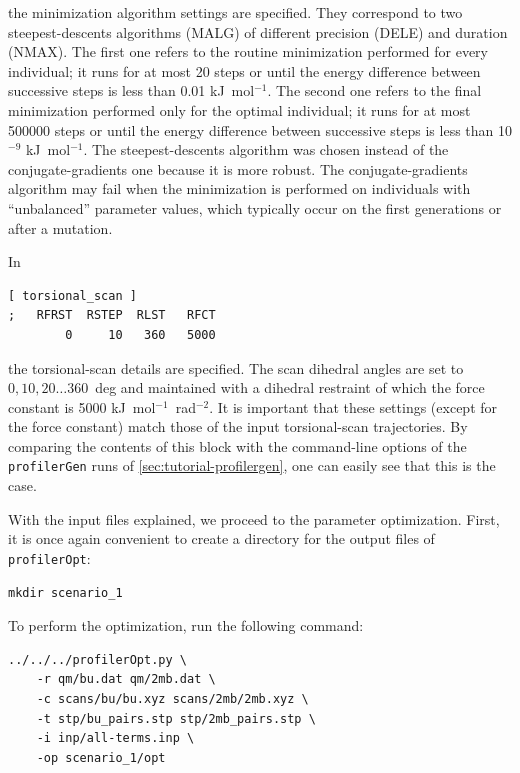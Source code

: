 \documentclass[10pt,a4paper,openany]{memoir}
\numberwithin{equation}{section}
\newcommand{\profileropt}[0]{\texttt{profilerOpt}}
\newcommand{\profilergen}[0]{\texttt{profilerGen}}
\begin{document}
\noindent the minimization algorithm settings are specified.
%
They correspond to two steepest-descents algorithms (MALG) of
different precision (DELE) and duration (NMAX).
%
The first one refers to the routine minimization performed for every
individual; it runs for at most 20 steps or until the energy
difference between successive steps is less than 0.01 kJ~mol$^{-1}$.
%
The second one refers to the final minimization performed only for the
optimal individual; it runs for at most 500000 steps or until the energy
difference between successive steps is less than 10$^{-9}$
kJ~mol$^{-1}$.
%
The steepest-descents algorithm was chosen instead of the
conjugate-gradients one because it is more robust.
%
The conjugate-gradients algorithm may fail when the minimization is
performed on individuals with ``unbalanced'' parameter values, which
typically occur on the first generations or after a mutation.

In

\begin{lstlisting}[language=gromacs]
[ torsional_scan ]
;   RFRST  RSTEP  RLST   RFCT
        0     10   360   5000
\end{lstlisting}\vspace{1ex}\par

\noindent the torsional-scan details are specified.
%
The scan dihedral angles are set to $0,10,20\ldots 360$~deg and
maintained with a dihedral restraint of which the force constant is
5000 kJ~mol$^{-1}$~rad$^{-2}$.
%
It is important that these settings (except for the force constant)
match those of the input torsional-scan trajectories.
%
By comparing the contents of this block with the command-line options
of the \profilergen{} runs of \autoref{sec:tutorial-profilergen}, one
can easily see that this is the case.

With the input files explained, we proceed to the parameter
optimization.
%
First, it is once again convenient to create a directory for the
output files of \profileropt{}:

\begin{lstlisting}
mkdir scenario_1
\end{lstlisting}\vspace{1ex}\par

\noindent To perform the optimization, run the following command:

\begin{lstlisting}
../../../profilerOpt.py \
    -r qm/bu.dat qm/2mb.dat \
    -c scans/bu/bu.xyz scans/2mb/2mb.xyz \
    -t stp/bu_pairs.stp stp/2mb_pairs.stp \
    -i inp/all-terms.inp \
    -op scenario_1/opt
\end{lstlisting}\vspace{1ex}\par
\end{document}
